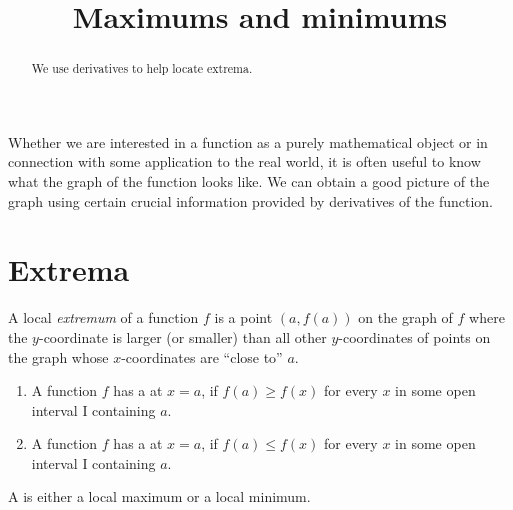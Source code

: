 \documentclass{ximera}
\title[Dig-In]{Maximums and minimums}
\begin{document}
\begin{abstract}
We use derivatives to help locate extrema.  
\end{abstract}
\maketitle


Whether we are interested in a function as a purely mathematical
object or in connection with some application to the real world, it is
often useful to know what the graph of the function looks like. We can
obtain a good picture of the graph using certain crucial information
provided by derivatives of the function.

\section{Extrema}

A local \textit{extremum} of a function $f$ is a point $(a,f(a))$ on the graph of  $f$ where the
$y$-coordinate is larger (or smaller) than all other $y$-coordinates
 of points on the graph whose $x$-coordinates are ``close to''  $a$. 

\begin{definition}\hfil{}
\begin{enumerate}
\item A function $f$ has a  at $x=a$, if $f(a)\ge
  f(x)$ for every $x$ in some open interval I containing $a$.
\item A function $f$ has a  at $x=a$, if $f(a)\le
  f(x)$ for every $x$  in some open interval I containing $a$.
\end{enumerate}
A  is either a local
maximum or a local minimum.
\end{definition}
\end{document}
